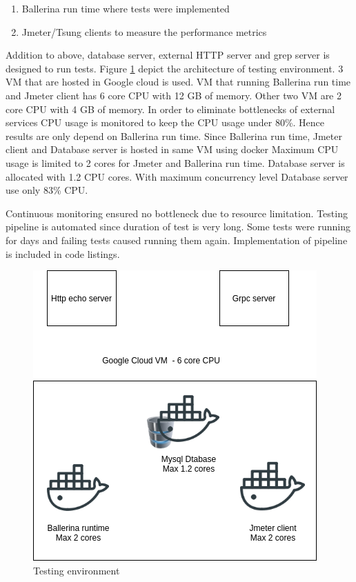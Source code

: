 \begin{enumerate}
	\item Ballerina run time where tests were implemented
	\item Jmeter/Tsung clients to measure the performance metrics 
\end{enumerate}
	
Addition to above, database server, external HTTP server and grep server is designed to run tests. Figure \ref{testing_env} depict the architecture of testing environment. 3  \acrfull{VM} that are hosted in Google cloud is used. VM that running Ballerina run time and Jmeter client has 6 core CPU with 12 GB of memory. Other two VM are 2 core CPU with 4 GB of memory. In order to eliminate bottlenecks of external services CPU usage is monitored to keep the CPU usage under 80\%. Hence results are only depend on Ballerina run time. Since Ballerina run time, Jmeter client and Database server is hosted in same VM using docker Maximum CPU usage is limited to 2 cores for Jmeter and Ballerina run time. Database server is allocated with 1.2 CPU cores. With maximum concurrency level Database server use only 83\% CPU. 

Continuous monitoring ensured no bottleneck due to resource limitation. Testing pipeline is automated since duration of test is very long. Some tests were running for days and failing tests caused running them again. Implementation of pipeline is included in code listings.

\begin{figure}[htbp]
	\begin{center}
		\includegraphics[scale=0.5]{figures/Tes_env.png}
	\end{center}
	\caption{Testing environment}
	\label{testing_env}
\end{figure}

